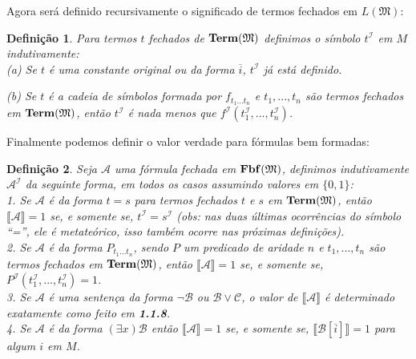 \documentclass[11pt,a4paper]{article}
\newtheorem{mydef}{Definição}[section]
\theoremstyle{definition}
\begin{document}
Agora será definido recursivamente o significado de termos fechados em $L(\mathfrak{M})$:

\begin{mydef}
	
	Para termos $t$ fechados de $\textrm{\textbf{Term}}(\mathfrak{M})$ definimos o símbolo $t^\mathscr{I}$ em $M$ indutivamente: \\
	
	(a) Se $t$ é uma constante original ou da forma $\overline{i}$, $t^\mathscr{I}$ já está definido. 
	
	(b) Se $t$ é a cadeia de símbolos formada por $f_{t_1 ... t_n}$ e $t_1,...,t_n$ são termos fechados em $\textrm{\textbf{Term}}(\mathfrak{M})$, então $t^\mathscr{I}$ é nada menos que $f^\mathscr{I}(t_1^\mathscr{I}, ..., t_n^\mathscr{I})$.
	
\end{mydef}

Finalmente podemos definir o valor verdade para fórmulas bem formadas: 

\begin{mydef}
	
	Seja $\mathscr{A}$ uma fórmula fechada em $\textrm{\textbf{Fbf}}(\mathfrak{M})$, definimos indutivamente $\mathscr{A}^\mathscr{I}$ da seguinte forma, em todos os casos assumindo valores em $\{ 0,1\}$: \\
	
	1. Se $\mathscr{A}$ é da forma $t=s$ para termos fechados $t$ e $s$ em  $\textrm{\textbf{Term}}(\mathfrak{M})$, então $\llbracket\mathscr{A}\rrbracket=1$ se, e somente se, $t^\mathscr{I}=s^\mathscr{I}$ (obs: nas duas últimas ocorrências do símbolo ``='', ele é metateórico, isso também ocorre nas próximas definições). \\
	
	2. Se $\mathscr{A}$ é da forma $P_{t_1...t_n}$, sendo $P$ um predicado de aridade $n$ e $t_1,...,t_n$ são termos fechados em  $\textrm{\textbf{Term}}(\mathfrak{M})$, então $\llbracket\mathscr{A} \rrbracket=1$ se, e somente se, $P^\mathscr{I}(t_1^\mathscr{I},...,t_n^\mathscr{I})=1$. \\
	
	3. Se $\mathscr{A}$ é uma sentença da forma $\neg \mathscr{B}$ ou $\mathscr{B}\vee \mathscr{C}$, o valor de $\llbracket\mathscr{A} \rrbracket$ é determinado exatamente como feito em \textbf{1.1.8}. \\
	
	4. Se $\mathscr{A}$ é da forma $(\exists x) \mathscr{B}$ então $\llbracket\mathscr{A} \rrbracket=1$ se, e somente se, $\llbracket \mathscr{B}[\overline{i}] \rrbracket=1$ para algum $i$ em $M$.
	
	
\end{mydef}
\end{document}
